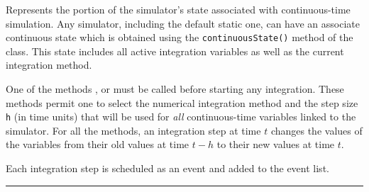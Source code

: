 
Represents the portion of the simulator's state associated with
continuous-time simulation.
Any simulator, including the default static one, can have an associate continuous state
which is obtained using the \texttt{continuousState()} method
of the  class.
This state includes all active integration variables as well as the current integration method.

One of the methods ,  or
 must be called before starting 
any integration.
These methods permit one to select the numerical integration method 
and the step size \texttt{h} (in time units) that will be used
for \emph{all} continuous-time variables linked to the simulator.
For all the methods, an integration step at time $t$ changes 
the values of the variables from their old values at time $t-h$ to their
new values at time $t$.

Each integration step is scheduled as an event and added to the event list.

\bigskip\hrule

